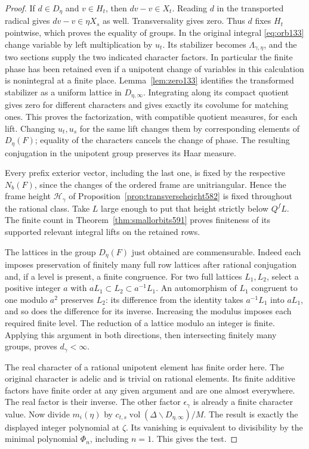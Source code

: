 \documentclass[a4paper,11pt]{article}
\theoremstyle{definition}
\theoremstyle{remark}
\numberwithin{equation}{section}
\begin{document}
\begin{proof}
If \(d\in D_\eta\) and \(v\in H_t\), then \(d v-v\in X_t\).
Reading \(d\) in the transported radical gives
\(d v-v\in\eta X_s\) as well. Transversality gives zero.
Thus \(d\) fixes \(H_t\) pointwise, which proves the equality
of groups. In the original integral \eqref{eq:orb133} change
variable by left multiplication by \(u_t\). Its stabilizer
becomes \(\Lambda_{\gamma,\eta}\), and the two sections supply
the two indicated character factors. In particular the finite
phase has been retained even if a unipotent change of variables
in this calculation is nonintegral at a finite place.
Lemma~\ref{lem:zero133} identifies the transformed stabilizer
as a uniform lattice in \(D_{\eta,\infty}\).
Integrating along its compact quotient gives zero for different
characters and gives exactly its covolume for matching ones.
This proves the factorization, with compatible quotient measures,
for each lift. Changing \(u_t,u_s\) for the same lift changes
them by corresponding elements of \(D_\eta(F)\); equality of
the characters cancels the change of phase. The resulting
conjugation in the unipotent group preserves its Haar measure.

Every prefix exterior vector, including the last one, is fixed
by the respective \(N_b(F)\), since the changes of the ordered
frame are unitriangular. Hence the frame height
\(\mathcal H_\gamma\) of Proposition~\ref{prop:transverseheight582}
is fixed throughout the rational class. Take \(L\) large enough
to put that height strictly below \(Q^fL\). The finite count
in Theorem~\ref{thm:smallorbits591} proves finiteness of its
supported relevant integral lifts on the retained rows.

The lattices in the group \(D_\eta(F)\) just obtained are
commensurable. Indeed each imposes preservation of finitely
many full row lattices after rational conjugation and, if a
level is present, a finite congruence. For two full lattices
\(L_1,L_2\), select a positive integer \(a\) with
\(aL_1\subset L_2\subset a^{-1}L_1\). An automorphism of
\(L_1\) congruent to one modulo \(a^2\) preserves \(L_2\):
its difference from the identity takes \(a^{-1}L_1\) into
\(aL_1\), and so does the difference for its inverse. Increasing
the modulus imposes each required finite level. The reduction
of a lattice modulo an integer is finite. Applying this
argument in both directions, then intersecting finitely many
groups, proves \(d_\gamma<\infty\).

The real character of a rational unipotent element has finite
order here. The original character is adelic and is trivial on
rational elements. Its finite additive factors have finite
order at any given argument and are one almost everywhere.
The real factor is their inverse. The other factor
\(\epsilon_\gamma\) is already a finite character value.
Now divide \(m_i(\eta)\) by
\(c_{t,s}\operatorname{vol}(\Delta\backslash D_{\eta,\infty})/M\).
The result is exactly the displayed integer polynomial at
\(\zeta\). Its vanishing is equivalent to divisibility by the
minimal polynomial \(\Phi_n\), including \(n=1\). This gives
the test.
\end{proof}
\end{document}
